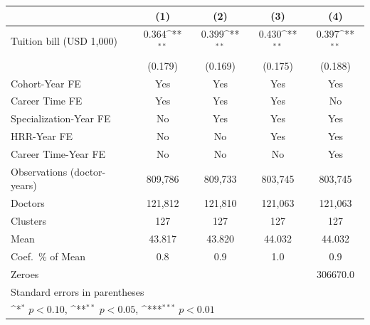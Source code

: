 {
\def\sym#1{\ifmmode^{#1}\else\(^{#1}\)\fi}
\begin{tabular}{l*{4}{c}}
\hline\hline
                    &\multicolumn{1}{c}{(1)}         &\multicolumn{1}{c}{(2)}         &\multicolumn{1}{c}{(3)}         &\multicolumn{1}{c}{(4)}         \\
\hline
Tuition bill (USD 1,000)&       0.364\sym{**} &       0.399\sym{**} &       0.430\sym{**} &       0.397\sym{**} \\
                    &     (0.179)         &     (0.169)         &     (0.175)         &     (0.188)         \\
[1em]
Cohort-Year FE      &         Yes         &         Yes         &         Yes         &         Yes         \\
[1em]
Career Time FE      &         Yes         &         Yes         &         Yes         &          No         \\
[1em]
Specialization-Year FE&          No         &         Yes         &         Yes         &         Yes         \\
[1em]
HRR-Year FE         &          No         &          No         &         Yes         &         Yes         \\
[1em]
Career Time-Year FE &          No         &          No         &          No         &         Yes         \\
\hline
Observations (doctor-years)&     809,786         &     809,733         &     803,745         &     803,745         \\
Doctors             &     121,812         &     121,810         &     121,063         &     121,063         \\
Clusters            &         127         &         127         &         127         &         127         \\
Mean                &      43.817         &      43.820         &      44.032         &      44.032         \\
Coef.\ \% of Mean   &         0.8         &         0.9         &         1.0         &         0.9         \\
Zeroes              &                     &                     &                     &    306670.0         \\
\hline\hline
\multicolumn{5}{l}{\footnotesize Standard errors in parentheses}\\
\multicolumn{5}{l}{\footnotesize \sym{*} \(p<0.10\), \sym{**} \(p<0.05\), \sym{***} \(p<0.01\)}\\
\end{tabular}
}
